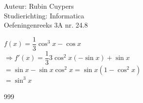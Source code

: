 \documentclass[a4paper]{article}
\begin{document}
  
\noindent \large Auteur: Rubin Cuypers \\
\noindent \large Studierichting: Informatica\\
\noindent \large Oefeningenreeks 3A nr. 24.8\\

\medskip

\normalsize

$f(x)=\dfrac{1}{3}\cos^3x-\cos x$\\

$\Rightarrow f'(x)=\dfrac{1}{3} 3\cos^2x(-\sin x)+\sin x$\\

$=\sin x -\sin x \cos^2x=\sin x(1-\cos^2 x)$\\

$=\sin^3 x$\\

\begin{thebibliography}{999}
\end{thebibliography}
\end{document}
